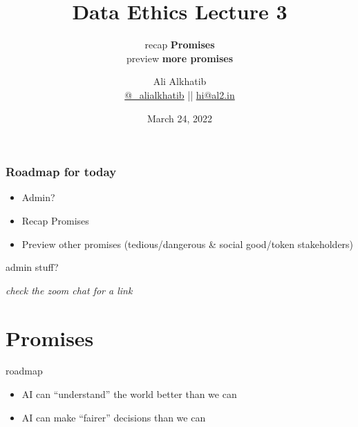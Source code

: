 \documentclass[aspectratio=169,17pt]{beamer} %
\title{Data Ethics Lecture 3}
\subtitle{recap {\bfseries Promises}\\preview {\bfseries more promises}}
\author[Ali Alkhatib]{{Ali Alkhatib}\\
\href{http://twitter.com/_alialkhatib}{@\_alialkhatib} || \href{mailto:hi@al2.in}{hi@al2.in}}
\date{March 24, 2022}
\newcommand{\onlyinsubfile}[1]{#1}
\newcommand{\notinsubfile}[1]{}
\begin{document}
\renewcommand{\onlyinsubfile}[1]{}
\renewcommand{\notinsubfile}[1]{#1}


\begin{frame}
\titlepage
\end{frame}

\begin{frame}[t]\frametitle{Roadmap for today}

\begin{itemize}
    \item Admin?
    \item Recap Promises
    \item Preview other promises (tedious/dangerous \& social good/token stakeholders)
\end{itemize}

\end{frame}

\begin{frame}{admin stuff?}
    
    \begin{itemize}
    \end{itemize}

\end{frame}


\begin{frame}[plain]

\centering
\emph{check the zoom chat for a link}

\end{frame}


\section{Promises}


\begin{frame}{roadmap}
\begin{itemize}
    \item AI can ``understand'' the world better than we can
    \item AI can make ``fairer'' decisions than we can
\end{itemize}

\end{frame}


\end{document}
